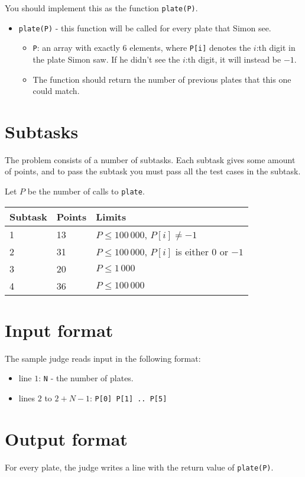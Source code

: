 You should implement this as the function \texttt{plate(P)}.
\begin{itemize}
  \item \texttt{plate(P)} - this function will be called for every plate that Simon see.
  \begin{itemize}
    \item \texttt{P}: an array with exactly 6 elements, where \texttt{P[i]} denotes the $i$:th digit in the plate Simon saw.
      If he didn't see the $i$:th digit, it will instead be $-1$.
    \item The function should return the number of previous plates that this one could match.
  \end{itemize}
\end{itemize}

\section*{Subtasks}
The problem consists of a number of subtasks. Each subtask gives some amount of points, and to pass
the subtask you must pass all the test cases in the subtask.

Let $P$ be the number of calls to \texttt{plate}.

\begin{tabular}{|l|l|l|}
  \hline
  \textbf{Subtask} & \textbf{Points} & \textbf{Limits} \\ \hline
  1 & 13 & $P \le 100\,000$, $P[i] \not= -1$ \\ \hline
  2 & 31 & $P \le 100\,000$, $P[i]$ is either $0$ or $-1$ \\ \hline
  3 & 20 & $P \le 1\,000$ \\ \hline
  4 & 36 & $P \le 100\,000$ \\ \hline
\end{tabular}

\section*{Input format}
The sample judge reads input in the following format:

\begin{itemize}
  \item line $1$: \texttt{N} - the number of plates.
  \item lines $2$ to $2 + N - 1$: \texttt{P[0] P[1] .. P[5]}
\end{itemize}

\section*{Output format}
For every plate, the judge writes a line with the return value of \texttt{plate(P)}.
